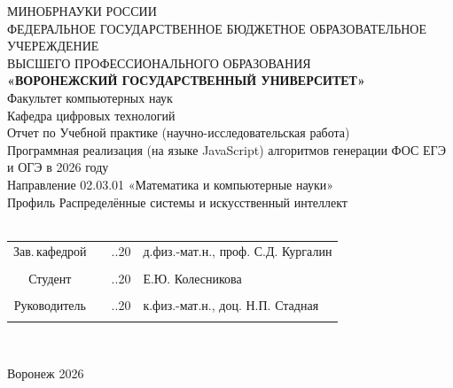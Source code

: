 
\begin{center}
	\hfill \break
	\large{МИНОБРНАУКИ РОССИИ}\\
	\footnotesize{ФЕДЕРАЛЬНОЕ ГОСУДАРСТВЕННОЕ БЮДЖЕТНОЕ ОБРАЗОВАТЕЛЬНОЕ УЧЕРЕЖДЕНИЕ}\\
	\footnotesize{ВЫСШЕГО ПРОФЕССИОНАЛЬНОГО ОБРАЗОВАНИЯ}\\
	\small{\textbf{«ВОРОНЕЖСКИЙ ГОСУДАРСТВЕННЫЙ УНИВЕРСИТЕТ»}}\\
	\hfill \break
	\normalsize{Факультет компьютерных наук}\\
	\hfill \break
	\normalsize{Кафедра цифровых технологий}\\
	\hfill\break
	\hfill \break
	\hfill \break
	\hfill \break
	\normalsize{Отчет по Учебной практике (научно-исследовательская работа)}\\
	\hfill \break
	\normalsize{Программная реализация (на языке JavaScript) алгоритмов генерации ФОС ЕГЭ и ОГЭ в 2026 году}\\
	\hfill \break
	\normalsize{
		\hfill \break
		Направление 02.03.01 «Математика и компьютерные науки»\\
		Профиль Распределённые системы и искусственный интеллект\\
		\hfill \break
	}\\
	\hfill \break
	\hfill \break
	\hfill \break
	\hfill \break
	\hfill \break
\end{center}
\hfill \break

\normalsize{
	\begin{tabular}{cccl}
		Зав.\,кафедрой & \underline{\hspace{3cm}} & \underline{\hspace{0.5cm}}.\underline{\hspace{0.5cm}}.20\underline{\hspace{0.5cm}}  & д.физ.-мат.н.,  проф. С.Д. Кургалин    \\\\
		Студент & \underline{\hspace{3cm}} & \underline{\hspace{0.5cm}}.\underline{\hspace{0.5cm}}.20\underline{\hspace{0.5cm}}                                      & Е.Ю. Колесникова    \\\\
		Руководитель & \underline{\hspace{3cm}} & \underline{\hspace{0.5cm}}.\underline{\hspace{0.5cm}}.20\underline{\hspace{0.5cm}}  & к.физ.-мат.н.,      доц. Н.П. Стадная    \\\\
	\end{tabular}
}\\
\hfill \break
\hfill \break
\begin{center} Воронеж 2026 \end{center}
\thispagestyle{empty} %

